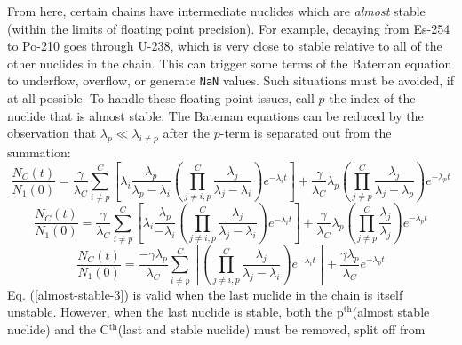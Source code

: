 \documentclass[letterpaper]{physor2018}
\newcommand{\pth}{p$^{\mathrm{th}}$\xspace}
\newcommand{\Cth}{C$^{\mathrm{th}}$\xspace}
\begin{document}
From here, certain chains have intermediate nuclides which are \emph{almost} stable
(within the limits of floating point precision). For example, decaying
from Es-254 to Po-210 goes through U-238, which is very close to stable relative to all of the
other nuclides in the chain. This can trigger some terms of the Bateman equation to
underflow, overflow, or generate \texttt{NaN} values. Such situations must be avoided,
if at all possible. To handle these floating point issues, call $p$ the index of the nuclide
that is almost stable. The Bateman equations can be reduced by the
observation that $\lambda_p \ll \lambda_{i\ne p}$ after the $p$-term is separated out
from the summation:
\begin{equation}
\label{almost-stable-0}
\frac{N_C(t)}{N_1(0)} = \frac{\gamma}{\lambda_C}\sum_{i\ne p}^C \left[\lambda_i \frac{\lambda_p}{\lambda_p - \lambda_i}
                                                    \left(\prod_{j\ne i,p}^C \frac{\lambda_j}{\lambda_j - \lambda_i}\right)
                                                    e^{-\lambda_i t}\right]
                       + \frac{\gamma}{\lambda_C} \lambda_p \left(\prod_{j\ne p}^C \frac{\lambda_j}{\lambda_j - \lambda_p} \right) e^{-\lambda_p t}
\end{equation}
\begin{equation}
\label{almost-stable-2}
   \frac{N_C(t)}{N_1(0)} = \frac{\gamma}{\lambda_C}\sum_{i\ne p}^C \left[\lambda_i \frac{\lambda_p}{- \lambda_i}
                                                        \left(\prod_{j\ne i,p}^C \frac{\lambda_j}{\lambda_j - \lambda_i}\right)
                                                        e^{-\lambda_i t}\right]
                           + \frac{\gamma}{\lambda_C} \lambda_p \left(\prod_{j\ne p}^C \frac{\lambda_j}{\lambda_j}\right) e^{-\lambda_p t}
\end{equation}
\begin{equation}
\label{almost-stable-3}
   \frac{N_C(t)}{N_1(0)} = \frac{-\gamma\lambda_p}{\lambda_C}\sum_{i\ne p}^C \left[
                                                        \left(\prod_{j\ne i,p}^C \frac{\lambda_j}{\lambda_j - \lambda_i}\right)
                                                        e^{-\lambda_i t}\right]
                           + \frac{\gamma\lambda_p}{\lambda_C} e^{-\lambda_p t}
\end{equation}
Eq. (\ref{almost-stable-3}) is valid when the last
nuclide in the chain is itself unstable. However, when the last nuclide is stable,
both the \pth (almost stable nuclide) and
the \Cth (last and stable nuclide) must be removed, split off from
\end{document}
